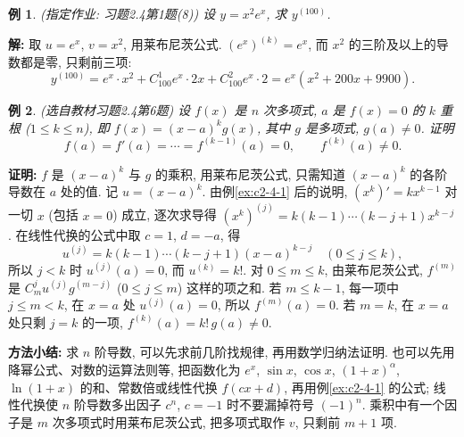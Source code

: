 \documentclass[UTF8,openany]{ctexbook}
\theoremstyle{chinesetextbook}
\newtheorem{example}{例}[section]
\newenvironment{cnproof}{\par\indent\textbf{证明:} \ignorespaces}{\par}
\newenvironment{cnsolution}{\par\indent\textbf{解:} \ignorespaces}{\par}
\begin{document}
\begin{example}\label{ex:c2-h4-1b}
\textnormal{(指定作业: 习题2.4第1题(8))} 设 $y=x^2e^x$, 求 $y^{(100)}$.
\end{example}
\begin{cnsolution}
取 $u=e^x$, $v=x^2$, 用莱布尼茨公式. $(e^x)^{(k)}=e^x$, 而 $x^2$ 的三阶及以上的导数都是零, 只剩前三项:
\[
y^{(100)}=e^x\cdot x^2+C_{100}^1e^x\cdot2x+C_{100}^2e^x\cdot2=e^x(x^2+200x+9900).
\]
\end{cnsolution}
\begin{example}\label{ex:c2-h4-6}
\textnormal{(选自教材习题2.4第6题)} 设 $f(x)$ 是 $n$ 次多项式, $a$ 是 $f(x)=0$ 的 $k$ 重根 ($1\le k\le n$), 即 $f(x)=(x-a)^kg(x)$, 其中 $g$ 是多项式, $g(a)\ne0$. 证明
\[
f(a)=f'(a)=\cdots=f^{(k-1)}(a)=0,\qquad f^{(k)}(a)\ne0.
\]
\end{example}
\begin{cnproof}
$f$ 是 $(x-a)^k$ 与 $g$ 的乘积, 用莱布尼茨公式, 只需知道 $(x-a)^k$ 的各阶导数在 $a$ 处的值. 记 $u=(x-a)^k$. 由例\ref{ex:c2-4-1} 后的说明, $(x^k)'=kx^{k-1}$ 对一切 $x$ (包括 $x=0$) 成立, 逐次求导得 $(x^k)^{(j)}=k(k-1)\cdots(k-j+1)x^{k-j}$. 在线性代换的公式中取 $c=1$, $d=-a$, 得
\[
u^{(j)}=k(k-1)\cdots(k-j+1)(x-a)^{k-j}\quad(0\le j\le k),
\]
所以 $j<k$ 时 $u^{(j)}(a)=0$, 而 $u^{(k)}=k!$. 对 $0\le m\le k$, 由莱布尼茨公式, $f^{(m)}$ 是 $C_m^ju^{(j)}g^{(m-j)}$ ($0\le j\le m$) 这样的项之和. 若 $m\le k-1$, 每一项中 $j\le m<k$, 在 $x=a$ 处 $u^{(j)}(a)=0$, 所以 $f^{(m)}(a)=0$. 若 $m=k$, 在 $x=a$ 处只剩 $j=k$ 的一项, $f^{(k)}(a)=k!\,g(a)\ne0$.
\end{cnproof}
\par\indent\textbf{方法小结:} 求 $n$ 阶导数, 可以先求前几阶找规律, 再用数学归纳法证明. 也可以先用降幂公式、对数的运算法则等, 把函数化为 $e^x$, $\sin x$, $\cos x$, $(1+x)^\alpha$, $\ln(1+x)$ 的和、常数倍或线性代换 $f(cx+d)$, 再用例\ref{ex:c2-4-1} 的公式; 线性代换使 $n$ 阶导数多出因子 $c^n$, $c=-1$ 时不要漏掉符号 $(-1)^n$. 乘积中有一个因子是 $m$ 次多项式时用莱布尼茨公式, 把多项式取作 $v$, 只剩前 $m+1$ 项.
\end{document}
